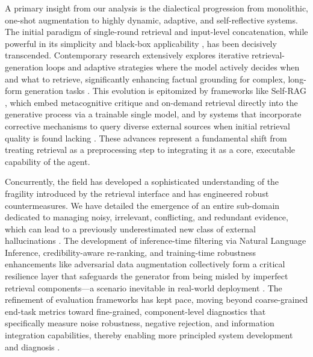 \documentclass[11pt,a4paper]{article}
\begin{document}
A primary insight from our analysis is the dialectical progression from monolithic, one-shot augmentation to highly dynamic, adaptive, and self-reflective systems. The initial paradigm of single-round retrieval and input-level concatenation, while powerful in its simplicity and black-box applicability \cite{arxiv:2301.12652v4}, has been decisively transcended. Contemporary research extensively explores iterative retrieval-generation loops and adaptive strategies where the model actively decides when and what to retrieve, significantly enhancing factual grounding for complex, long-form generation tasks \cite{arxiv:2305.06983v2,arxiv:2305.15294v2}. This evolution is epitomized by frameworks like Self-RAG \cite{arxiv:2310.11511v1}, which embed metacognitive critique and on-demand retrieval directly into the generative process via a trainable single model, and by systems that incorporate corrective mechanisms to query diverse external sources when initial retrieval quality is found lacking \cite{arxiv:2401.15884v2}. These advances represent a fundamental shift from treating retrieval as a preprocessing step to integrating it as a core, executable capability of the agent.

Concurrently, the field has developed a sophisticated understanding of the fragility introduced by the retrieval interface and has engineered robust countermeasures. We have detailed the emergence of an entire sub-domain dedicated to managing noisy, irrelevant, conflicting, and redundant evidence, which can lead to a previously underestimated new class of external hallucinations \cite{arxiv:2310.01558v1,arxiv:2405.20978v1}. The development of inference-time filtering via Natural Language Inference, credibility-aware re-ranking, and training-time robustness enhancements like adversarial data augmentation collectively form a critical resilience layer that safeguards the generator from being misled by imperfect retrieval components---a scenario inevitable in real-world deployment \cite{arxiv:2310.01558v1,arxiv:2405.20978v1}. The refinement of evaluation frameworks has kept pace, moving beyond coarse-grained end-task metrics toward fine-grained, component-level diagnostics that specifically measure noise robustness, negative rejection, and information integration capabilities, thereby enabling more principled system development and diagnosis \cite{arxiv:2309.01431v2,arxiv:2309.15217v1}.
\end{document}
